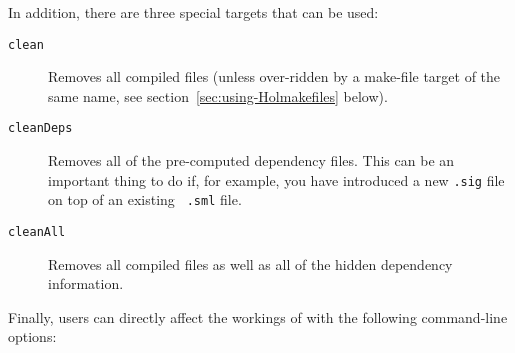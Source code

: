 In addition, there are three special targets that can be used:
\begin{description}
\item[{\tt clean}] Removes all compiled files (unless over-ridden by a
  make-file target of the same name, see
  section~\ref{sec:using-Holmakefiles} below).
\item [{\tt cleanDeps}] Removes all of the pre-computed dependency
  files.  This can be an important thing to do if, for example, you
  have introduced a new {\tt .sig} file on top of an existing {\tt
    .sml} file.
\item [{\tt cleanAll}] Removes all compiled files as well as all of
  the hidden dependency information.
\end{description}

\noindent Finally, users can directly affect the workings of \holmake{}
with the following command-line options:
